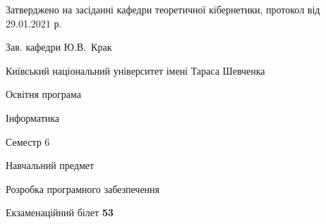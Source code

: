 \documentclass[10pt, ukrainian]{article}
\begin{document}
{\vspace{5mm}\smallskip \begin {small} Затверджено на засіданні кафедри теоретичної кібернетики, протокол  від   29.01.2021 р.\par\smallskip\smallskip
{\parbox {6.5 cm}{Зав. кафедри \dotfill Ю.В.~Крак}} \end{small}}
\newpage

{{\begin {small}\par
{ \center  Київський національний університет імені Тараса Шевченка \par}
{\parbox {5 cm}{Освітня програма \hfill}{\parbox {7 cm}{Інформатика \hfill}}\parbox {6 cm}{\hfill Семестр 6}}\par
{\parbox {5 cm} {Навчальний предмет \hfill}\parbox {7 cm}{Розробка програмного забезпечення \hfill}\parbox {6cm}{\hfill}\par}\vspace{-7pt} \end{small}}{\center Екзаменаційний білет \No \textbf
{ 53 }\par}}
\end{document}
